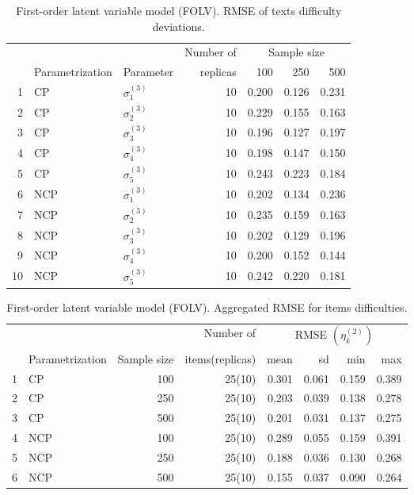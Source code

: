 \begin{table}[H]
	\centering
	\begin{tabular}{rllrrrr}
		\hline
		\multicolumn{3}{c}{ } & Number of &\multicolumn{3}{c}{ Sample size } \\ 
		\cmidrule(rl){5-7}
		& Parametrization & Parameter & replicas & 100 & 250 & 500 \\  
		\hline\hline
		1 & CP & $\sigma^{(3)}_{1}$ &   10 & 0.200 & 0.126 & 0.231 \\ 
		2 & CP & $\sigma^{(3)}_{2}$ &   10 & 0.229 & 0.155 & 0.163 \\ 
		3 & CP & $\sigma^{(3)}_{3}$ &   10 & 0.196 & 0.127 & 0.197 \\ 
		4 & CP & $\sigma^{(3)}_{4}$ &   10 & 0.198 & 0.147 & 0.150 \\ 
		5 & CP & $\sigma^{(3)}_{5}$ &   10 & 0.243 & 0.223 & 0.184 \\ 
		\hline
		6 & NCP & $\sigma^{(3)}_{1}$ &   10 & 0.202 & 0.134 & 0.236 \\ 
		7 & NCP & $\sigma^{(3)}_{2}$ &   10 & 0.235 & 0.159 & 0.163 \\ 
		8 & NCP & $\sigma^{(3)}_{3}$ &   10 & 0.202 & 0.129 & 0.196 \\ 
		9 & NCP & $\sigma^{(3)}_{4}$ &   10 & 0.200 & 0.152 & 0.144 \\ 
		10 & NCP & $\sigma^{(3)}_{5}$ &   10 & 0.242 & 0.220 & 0.181 \\ 
		\hline
	\end{tabular}
	\caption[First-order latent variable model (FOLV). RMSE of texts difficulty deviations.]%
	{First-order latent variable model (FOLV). RMSE of texts difficulty deviations.}
	\label{tab:FOLV_RMSE_texts_dev}
\end{table}
%
\begin{table}[ht]
	\centering
	\begin{tabular}{rlrrrrrr}
		\hline
		\multicolumn{3}{c}{ } & Number of &\multicolumn{4}{c}{ RMSE $( \eta^{(2)}_{k} )$ } \\ 
		\cmidrule(rl){5-8}
		& Parametrization & Sample size & items(replicas) & mean & sd & min & max \\  
		\hline\hline
		1 & CP &  100 & 25(10) & 0.301 & 0.061 & 0.159 & 0.389 \\ 
		2 & CP &  250 & 25(10) & 0.203 & 0.039 & 0.138 & 0.278 \\ 
		3 & CP &  500 & 25(10) & 0.201 & 0.031 & 0.137 & 0.275 \\ 
		\hline
		4 & NCP &  100 & 25(10) & 0.289 & 0.055 & 0.159 & 0.391 \\ 
		5 & NCP &  250 & 25(10) & 0.188 & 0.036 & 0.130 & 0.268 \\ 
		6 & NCP &  500 & 25(10) & 0.155 & 0.037 & 0.090 & 0.264 \\ 
		\hline
	\end{tabular}
	\caption[First-order latent variable model (FOLV). Aggregated RMSE for items difficulties.]%
	{First-order latent variable model (FOLV). Aggregated RMSE for items difficulties.}
	\label{tab:FOLV_RMSE_items}
\end{table}
